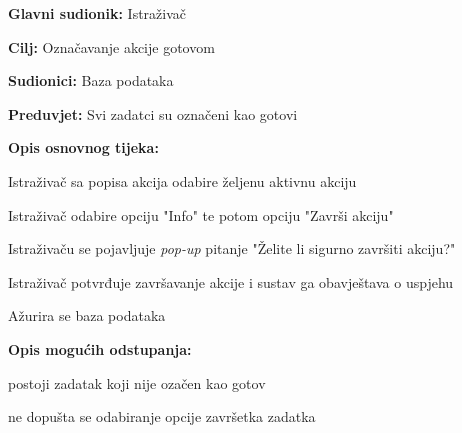 					\begin{packed_item}
	
						\item \textbf{Glavni sudionik: } Istraživač
						\item  \textbf{Cilj:} Označavanje akcije gotovom
						\item  \textbf{Sudionici:} Baza podataka
						\item  \textbf{Preduvjet:} Svi zadatci su označeni kao gotovi
						\item  \textbf{Opis osnovnog tijeka:}
						
						\item[] \begin{packed_enum}
	
							\item Istraživač sa popisa akcija odabire željenu aktivnu akciju 
							\item Istraživač odabire opciju "Info" te potom opciju "Završi akciju"
							\item Istraživaču se pojavljuje \textit{pop-up} pitanje "Želite li sigurno završiti akciju?"
							\item Istraživač potvrđuje završavanje akcije i sustav ga obavještava o uspjehu
							\item Ažurira se baza podataka
						
						\end{packed_enum}
						
						\item  \textbf{Opis mogućih odstupanja:}
						
						\item[] \begin{packed_item}
	
							\item[2.a] postoji zadatak koji nije ozačen kao gotov
							\item[] \begin{packed_enum}
								
								\item ne dopušta se odabiranje opcije završetka zadatka
								
							\end{packed_enum}

						\end{packed_item}
					\end{packed_item}
